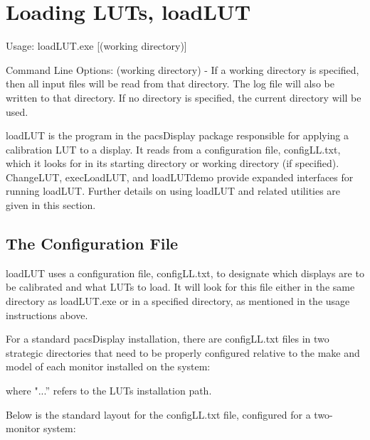 %

\section{Loading LUTs, loadLUT}

Usage: loadLUT.exe [(working directory)] 

Command Line Options: (working directory) - If a working directory is specified, then all input files will be read from that directory. The log file will also be written to that directory. If no directory is specified, the current directory will be used. 

loadLUT is the program in the pacsDisplay package responsible for applying a calibration LUT to a display. It reads from a configuration file, \textnormal{configLL.txt}, which it looks for in its starting directory or working directory (if specified). ChangeLUT, execLoadLUT, and loadLUTdemo provide expanded interfaces for running loadLUT. Further details on using loadLUT and related utilities are given in this section. 

\subsection{The Configuration File}

loadLUT uses a configuration file, \textnormal{configLL.txt}, to designate which displays are to be calibrated and what LUTs to load. It will look for this file either in the same directory as loadLUT.exe or in a specified directory, as mentioned in the usage instructions above. 

For a standard pacsDisplay installation, there are \textnormal{configLL.txt} files in two strategic directories that need to be properly configured relative to the make and model of each monitor installed on the system: 


where \textnormal{"...''} refers to the LUTs installation path.

Below is the standard layout for the configLL.txt file, configured for a two-monitor system: 

